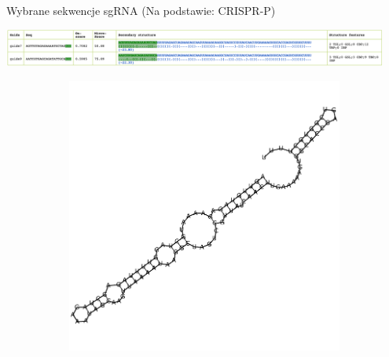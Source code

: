\documentclass[twoside, a4paper]{article}
\begin{document}
\pagebreak

\begin{table}
	\centering
	\caption{Wybrane sekwencje sgRNA (Na podstawie: CRISPR-P)}
	\includegraphics[width=0.95\textwidth]{./figures/gRNA.png}
\end{table}

\begin{figure}[h]
	\centering
	\begin{subfigure}[t]{0.45\textwidth}
		\includegraphics[width=\textwidth]{./figures/gRNA-ekson2.pdf}
		\caption{}
	\end{subfigure}
	\hfill
	\begin{subfigure}[t]{0.45\textwidth}

\end{subfigure}
\end{figure}
\end{document}
